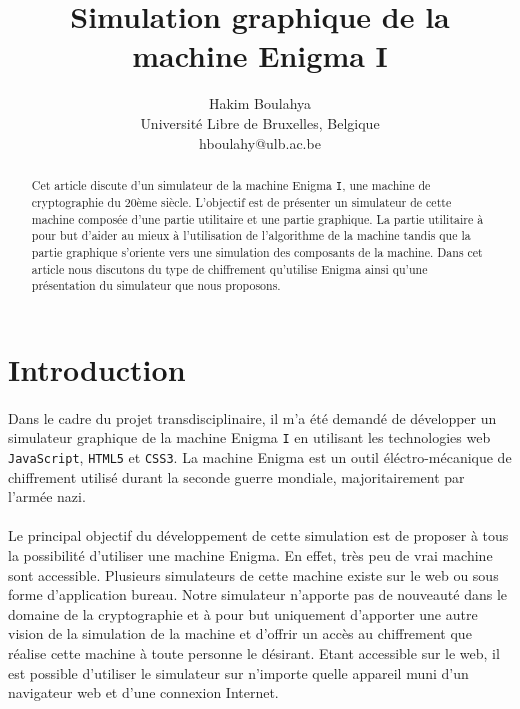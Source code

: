 \documentclass[letterpaper]{article}
\title{Simulation graphique de la machine Enigma I}
\author{Hakim Boulahya \\
Université Libre de Bruxelles, Belgique\\
hboulahy@ulb.ac.be}
\begin{document}
\maketitle

\begin{abstract}

Cet article discute d'un simulateur de la machine Enigma \texttt{I}, une machine de cryptographie du 20ème siècle. L'objectif est de présenter un simulateur de cette machine composée  d'une partie utilitaire et une partie graphique. La partie utilitaire à pour but d'aider au mieux à l'utilisation de l'algorithme de la machine tandis que la partie graphique s'oriente vers une simulation des composants de la machine. Dans cet article nous discutons du type de chiffrement qu'utilise Enigma ainsi qu'une présentation du simulateur que nous proposons.

\end{abstract}


\section{Introduction}


\paragraph{}

Dans le cadre du projet transdisciplinaire, il m'a été demandé de développer un simulateur graphique de la machine Enigma \texttt{I} en utilisant les technologies web \texttt{JavaScript}, \texttt{HTML5} et \texttt{CSS3}. La machine Enigma est un outil éléctro-mécanique de chiffrement utilisé durant la seconde guerre mondiale, majoritairement par l'armée nazi.

\paragraph{}

Le principal objectif du développement de cette simulation est de proposer à tous la possibilité d'utiliser une machine Enigma. En effet, très peu de vrai machine sont accessible. Plusieurs simulateurs de cette machine existe sur le web ou sous forme d'application bureau. Notre simulateur n'apporte pas de nouveauté dans le domaine de la cryptographie et à pour but uniquement d'apporter une autre vision de la simulation de la machine et d'offrir un accès au chiffrement que réalise cette machine à toute personne le désirant. Etant accessible sur le web, il est possible d'utiliser le simulateur \cite{MYSIMU} sur n'importe quelle appareil muni d'un navigateur web et d'une connexion Internet.
\end{document}
